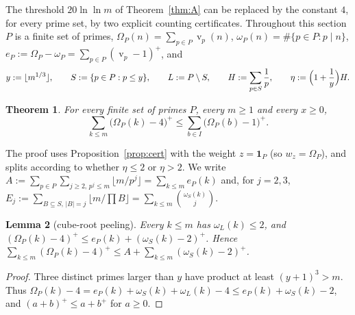 \documentclass[11pt]{article}
\newtheorem{theorem}{Theorem}[section]
\newtheorem{lemma}[theorem]{Lemma}
\theoremstyle{definition}
\DeclareMathOperator{\vp}{v}
\begin{document}
The threshold $20\ln\ln m$ of Theorem~\ref{thm:A} can be replaced by the constant $4$, for every prime set, by two
explicit counting certificates. Throughout this section $P$ is a finite set of primes, $\Omega_P(n)=\sum_{p\in P}\vp_p(n)$,
$\omega_P(n)=\#\{p\in P:p\mid n\}$, $e_P:=\Omega_P-\omega_P=\sum_{p\in P}(\vp_p-1)^+$, and
\[
y:=\lfloor m^{1/3}\rfloor,\qquad S:=\{p\in P:p\le y\},\qquad L:=P\setminus S,\qquad
H:=\sum_{p\in S}\frac1p,\qquad \eta:=\Bigl(1+\frac1y\Bigr)H .
\]

\begin{theorem}\label{thm:four}
For every finite set of primes $P$, every $m\ge1$ and every $x\ge0$,
\begin{equation}\label{eq:four}
\sum_{k\le m}\bigl(\Omega_P(k)-4\bigr)^+\le\sum_{b\in I}\bigl(\Omega_P(b)-1\bigr)^+ .
\end{equation}
\end{theorem}

The proof uses Proposition~\ref{prop:cert} with the weight $z=\mathbf 1_P$ (so $w_z=\Omega_P$), and splits according to
whether $\eta\le2$ or $\eta>2$. We write $A:=\sum_{p\in P}\sum_{j\ge2,\,p^j\le m}\lfloor m/p^j\rfloor=\sum_{k\le m}e_P(k)$ and, for
$j=2,3$, $E_j:=\sum_{B\subseteq S,\,|B|=j}\lfloor m/\prod B\rfloor=\sum_{k\le m}\binom{\omega_S(k)}j$.

\begin{lemma}[cube-root peeling]\label{lem:peel}
Every $k\le m$ has $\omega_L(k)\le2$, and $(\Omega_P(k)-4)^+\le e_P(k)+(\omega_S(k)-2)^+$. Hence
$\sum_{k\le m}(\Omega_P(k)-4)^+\le A+\sum_{k\le m}(\omega_S(k)-2)^+$.
\end{lemma}
\begin{proof}
Three distinct primes larger than $y$ have product at least $(y+1)^3>m$. Thus $\Omega_P(k)-4=e_P(k)+\omega_S(k)+\omega_L(k)-4\le
e_P(k)+\omega_S(k)-2$, and $(a+b)^+\le a+b^+$ for $a\ge0$.
\end{proof}
\end{document}

